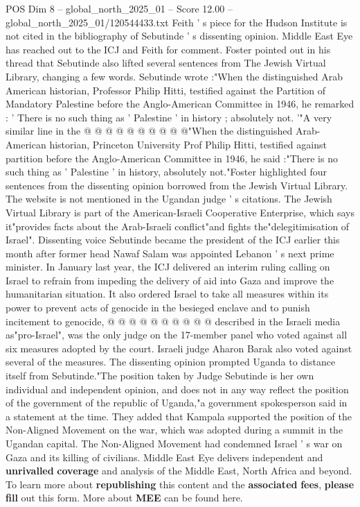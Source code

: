 \begin{textsample}{POS Dim 8 – global\_north\_2025\_01 – Score 12.00 – global\_north\_2025\_01/120544433.txt}
Feith ' s piece for the Hudson Institute is not cited in the bibliography of Sebutinde ' s dissenting opinion.
Middle East Eye has reached out to the ICJ and Feith for comment.
Foster pointed out in his thread that Sebutinde also lifted several sentences from The Jewish Virtual Library, changing a few words.
Sebutinde wrote :"When the distinguished Arab American historian, Professor Philip Hitti, testified against the Partition of Mandatory Palestine before the Anglo-American Committee in 1946, he remarked : ' There is no such thing as ' Palestine ' in history ; absolutely not. '"A very similar line in the @ @ @ @ @ @ @ @ @ @"When the distinguished Arab-American historian, Princeton University Prof Philip Hitti, testified against partition before the Anglo-American Committee in 1946, he said :"There is no such thing as ' Palestine ' in history, absolutely not."Foster highlighted four sentences from the dissenting opinion borrowed from the Jewish Virtual Library.
The website is not mentioned in the Ugandan judge ' s citations.
The Jewish Virtual Library is part of the American-Israeli Cooperative Enterprise, which says it"provides facts about the Arab-Israeli conflict"and fights the"delegitimisation of Israel".
Dissenting voice Sebutinde became the president of the ICJ earlier this month after former head Nawaf Salam was appointed Lebanon ' s next prime minister.
In January last year, the ICJ delivered an interim ruling calling on Israel to refrain from impeding the delivery of aid into Gaza and improve the humanitarian situation.
It also ordered Israel to take all measures within its power to prevent acts of genocide in the besieged enclave and to punish incitement to genocide, @ @ @ @ @ @ @ @ @ @ described in the Israeli media as"pro-Israel", was the only judge on the 17-member panel who voted against all six measures adopted by the court.
Israeli judge Aharon Barak also voted against several of the measures.
The dissenting opinion prompted Uganda to distance itself from Sebutinde."The position taken by Judge Sebutinde is her own individual and independent opinion, and does not in any way reflect the position of the government of the republic of Uganda,"a government spokesperson said in a statement at the time.
They added that Kampala supported the position of the Non-Aligned Movement on the war, which was adopted during a summit in the Ugandan capital.
The Non-Aligned Movement had condemned Israel ' s war on Gaza and its killing of civilians.
Middle East Eye delivers independent and \textbf{unrivalled} \textbf{coverage} and analysis of the Middle East, North Africa and beyond.
To learn more about \textbf{republishing} this content and the \textbf{associated} \textbf{fees}, \textbf{please} \textbf{fill} out this form.
More about \textbf{MEE} can be found here.

\end{textsample}
